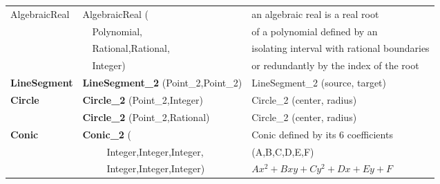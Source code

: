 \begin{tabular}{*{3}{| l} |}
AlgebraicReal & AlgebraicReal (         & an algebraic real is a real root\\
              & \ \ Polynomial,         & of a polynomial defined by an\\
              & \ \ Rational,Rational,  & isolating interval with rational boundaries\\
              & \ \ Integer)            & or redundantly by the index of the root\\ \hline

{\bf LineSegment} & {\bf LineSegment\_2} (Point\_2,Point\_2) & LineSegment\_2 (source, target) \\ \hline

{\bf Circle}   & {\bf Circle\_2} (Point\_2,Integer) & Circle\_2 (center, radius) \\ 
               & {\bf Circle\_2} (Point\_2,Rational) & Circle\_2 (center, radius) \\ \hline

{\bf Conic}  & {\bf Conic\_2} (
                               & Conic defined by its 6 coefficients \\
             & \ \ \ \ \ Integer,Integer,Integer,
                     &  (A,B,C,D,E,F) \\
             & \ \ \ \ \ Integer,Integer,Integer)        
                     &  \begin{math} Ax^2+Bxy+Cy^2+Dx+Ey+F \end{math}\\ \hline



\end{tabular}
